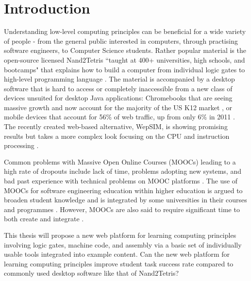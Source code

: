\chapter{Introduction}
\label{Introduction}

Understanding low-level computing principles can be beneficial for a wide variety of people - from the general public interested in computers, through practising software engineers, to Computer Science students.
Rather popular material is the open-source licensed Nand2Tetris ``taught at 400+ universities, high schools, and bootcamps" that explains how to build a computer from individual logic gates to high-level programming language \parencite{nand2tetrisweb}.
The material is accompanied by a desktop software that is hard to access or completely inaccessible from a new class of devices unsuited for desktop Java applications: Chromebooks that are seeing massive growth and now account for the majority of the US K12 market \parencite{Boreham_2019} \parencite{IDC_2021}, or mobile devices that account for 56\% of web traffic, up from only 6\% in 2011 \parencite{StatCounter_2021}.
The recently created web-based alternative, WepSIM, is showing promising results but takes a more complex look focusing on the CPU and instruction processing \parencite{garcia2019wepsim}.

Common problems with Massive Open Online Courses (MOOCs) leading to a high rate of dropouts include lack of time, problems adopting new systems, and bad past experience with technical problems on MOOC platforms \parencite{onah2014dropout}.
The use of MOOCs for software engineering education within higher education is argued to broaden student knowledge and is integrated by some universities in their courses and programmes \parencite{stikkolorum2014mooc}. However, MOOCs are also said to require significant time to both create and integrate \parencite{stikkolorum2014mooc}.

This thesis will propose a new web platform for learning computing principles involving logic gates, machine code, and assembly via a basic set of individually usable tools integrated into example content.
Can the new web platform for learning computing principles improve student task success rate compared to commonly used desktop software like that of Nand2Tetris?
